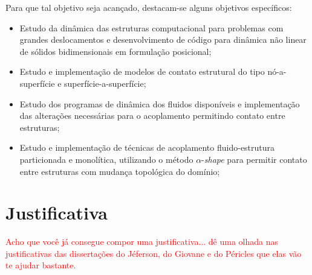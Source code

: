 \documentclass[_ArquivoPrincipal.tex]{subfiles}
\begin{document}
    Para que tal objetivo seja acançado, destacam-se alguns objetivos específicos:

    \begin{itemize}
        \item Estudo da dinâmica das estruturas computacional para problemas com grandes deslocamentos e desenvolvimento de código para dinâmica não linear de sólidos bidimensionais em formulação posicional;
        
        \item Estudo e implementação de modelos de contato estrutural do tipo nó-a-superfície e superfície-a-superfície;
        
        \item Estudo dos programas de dinâmica dos fluidos disponíveis e implementação das alterações necessárias para o acoplamento permitindo contato entre estruturas;
        
        \item Estudo e implementação de técnicas de acoplamento fluido-estrutura particionada e monolítica, utilizando o método $\alpha$-\textit{shape} para permitir contato entre estruturas com mudança topológica do domínio;
    \end{itemize}
    

\section{Justificativa}

\textcolor{red}{Acho que você já consegue compor uma justificativa... dê uma olhada nas justificativas das dissertações do Jéferson, do Giovane e do Péricles que elas vão te ajudar bastante.}

	
\end{document}
